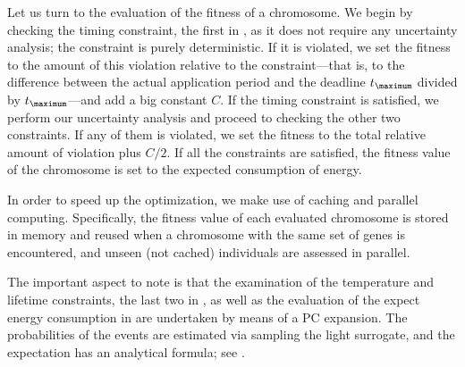 Let us turn to the evaluation of the fitness of a chromosome. We begin by
checking the timing constraint, the first in , as it
does not require any uncertainty analysis; the constraint is purely
deterministic. If it is violated, we set the fitness to the amount of this
violation relative to the constraint---that is, to the difference between the
actual application period and the deadline $t_\maximum$ divided by
$t_\maximum$---and add a big constant $C$. If the timing constraint is
satisfied, we perform our uncertainty analysis and proceed to checking the other
two constraints. If any of them is violated, we set the fitness to the total
relative amount of violation plus $C / 2$. If all the constraints are satisfied,
the fitness value of the chromosome is set to the expected consumption of
energy.

In order to speed up the optimization, we make use of caching and parallel
computing. Specifically, the fitness value of each evaluated chromosome is
stored in memory and reused when a chromosome with the same set of genes is
encountered, and unseen (not cached) individuals are assessed in parallel.

The important aspect to note is that the examination of the temperature and
lifetime constraints, the last two in , as well as the
evaluation of the expect energy consumption in  are
undertaken by means of a \ac{PC} expansion. The probabilities of the events are
estimated via sampling the light surrogate, and the expectation has an
analytical formula; see .
